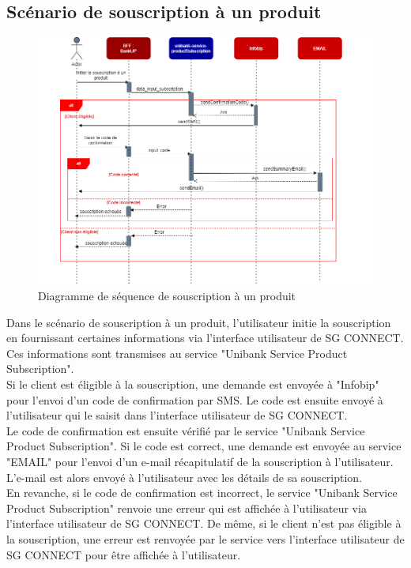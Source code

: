 \subsection{Scénario de souscription à un produit}
\begin{figure}[!h]
    \centering %
        \includegraphics[width=14cm]{images/conception/sequence_souscription.png}
    \caption{Diagramme de séquence de souscription à un produit}
\end{figure}
Dans le scénario de souscription à un produit, l'utilisateur initie la souscription en fournissant certaines informations via l'interface utilisateur de SG CONNECT. Ces informations sont transmises au service "Unibank Service Product Subscription".\\
Si le client est éligible à la souscription, une demande est envoyée à "Infobip" pour l'envoi d'un code de confirmation par SMS. Le code est ensuite envoyé à l'utilisateur qui le saisit dans l'interface utilisateur de SG CONNECT.\\
Le code de confirmation est ensuite vérifié par le service "Unibank Service Product Subscription". Si le code est correct, une demande est envoyée au service "EMAIL" pour l'envoi d'un e-mail récapitulatif de la souscription à l'utilisateur. L'e-mail est alors envoyé à l'utilisateur avec les détails de sa souscription.\\
En revanche, si le code de confirmation est incorrect, le service "Unibank Service Product Subscription" renvoie une erreur qui est affichée à l'utilisateur via l'interface utilisateur de SG CONNECT. De même, si le client n'est pas éligible à la souscription, une erreur est renvoyée par le service vers l'interface utilisateur de SG CONNECT pour être affichée à l'utilisateur.

